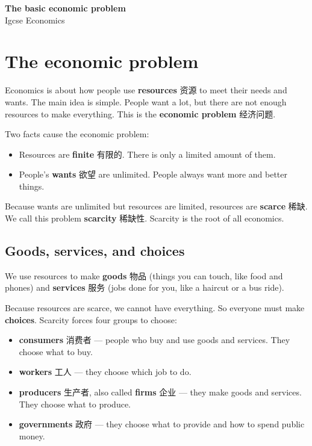 \documentclass[11pt]{article}
\begin{document}
\begin{center}
  {\LARGE\bfseries The basic economic problem}\\[0.35em]
  {\large Igcse Economics}
\end{center}
\vspace{0.6em}

\section*{The economic problem}

Economics is about how people use \textbf{resources} 资源 to meet their needs and wants. The main idea is simple. People want a lot, but there are not enough resources to make everything. This is the \textbf{economic problem} 经济问题.

Two facts cause the economic problem:

\begin{itemize}
\item Resources are \textbf{finite} 有限的. There is only a limited amount of them.

\item People's \textbf{wants} 欲望 are unlimited. People always want more and better things.

\end{itemize}

Because wants are unlimited but resources are limited, resources are \textbf{scarce} 稀缺. We call this problem \textbf{scarcity} 稀缺性. Scarcity is the root of all economics.

\subsection*{Goods, services, and choices}

We use resources to make \textbf{goods} 物品 (things you can touch, like food and phones) and \textbf{services} 服务 (jobs done for you, like a haircut or a bus ride).

Because resources are scarce, we cannot have everything. So everyone must make \textbf{choices}. Scarcity forces four groups to choose:

\begin{itemize}
\item \textbf{consumers} 消费者 — people who buy and use goods and services. They choose what to buy.

\item \textbf{workers} 工人 — they choose which job to do.

\item \textbf{producers} 生产者, also called \textbf{firms} 企业 — they make goods and services. They choose what to produce.

\item \textbf{governments} 政府 — they choose what to provide and how to spend public money.

\end{itemize}
\end{document}
